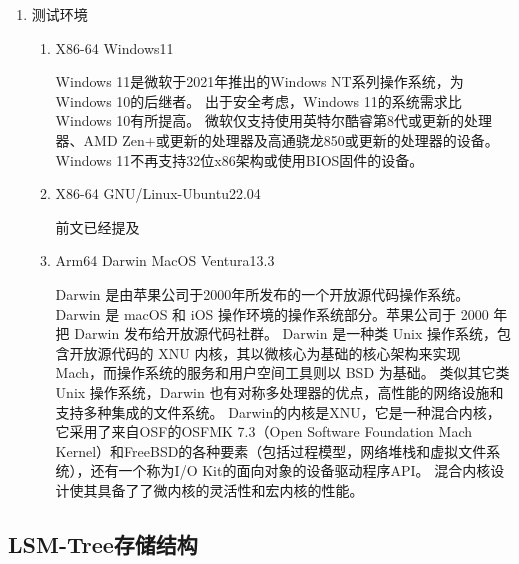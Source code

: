 \begin{enumerate}[fullwidth,itemindent=2em,listparindent=2em]
\begin{enumerate}
			\end{enumerate}
		\item 测试环境
			\begin{enumerate}
				\item {X86-64 Windows11}
				
				Windows 11是微软于2021年推出的Windows NT系列操作系统，为Windows 10的后继者。
				出于安全考虑，Windows 11的系统需求比Windows 10有所提高。
				微软仅支持使用英特尔酷睿第8代或更新的处理器、AMD Zen+或更新的处理器及高通骁龙850或更新的处理器的设备。
				Windows 11不再支持32位x86架构或使用BIOS固件的设备。
				
				\item X86-64 GNU/Linux-Ubuntu22.04
				
				前文已经提及
				\item Arm64 Darwin MacOS Ventura13.3
				
				Darwin 是由苹果公司于2000年所发布的一个开放源代码操作系统。Darwin 是 macOS 和 iOS 操作环境的操作系统部分。苹果公司于 2000 年把 Darwin 发布给开放源代码社群。
				Darwin 是一种类 Unix 操作系统，包含开放源代码的 XNU 内核，其以微核心为基础的核心架构来实现 Mach，而操作系统的服务和用户空间工具则以 BSD 为基础。
				类似其它类 Unix 操作系统，Darwin 也有对称多处理器的优点，高性能的网络设施和支持多种集成的文件系统。
				Darwin的内核是XNU，它是一种混合内核，它采用了来自OSF的OSFMK 7.3（Open Software Foundation Mach Kernel）和FreeBSD的各种要素（包括过程模型，网络堆栈和虚拟文件系统），还有一个称为I/O Kit的面向对象的设备驱动程序API。
				混合内核设计使其具备了了微内核的灵活性和宏内核的性能。
			\end{enumerate}
  
  	\end{enumerate}
     
    \subsection{LSM-Tree存储结构}
    
